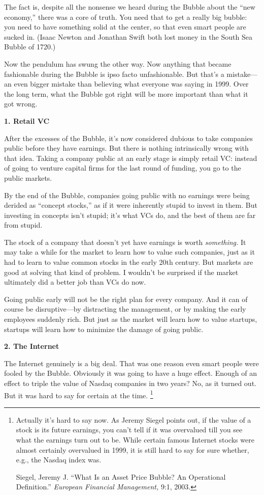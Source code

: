 The fact is, despite all the nonsense we heard during the Bubble about
the ``new economy,'' there was a core of truth. You need that to get a
really big bubble: you need to have something solid at the center, so
that even smart people are sucked in. (Isaac Newton and Jonathan Swift
both lost money in the South Sea Bubble of 1720.)

Now the pendulum has swung the other way. Now anything that became
fashionable during the Bubble is ipso facto unfashionable. But that's a
mistake---an even bigger mistake than believing what everyone was saying
in 1999. Over the long term, what the Bubble got right will be more
important than what it got wrong.

\textbf{1. Retail VC}

After the excesses of the Bubble, it's now considered dubious to take
companies public before they have earnings. But there is nothing
intrinsically wrong with that idea. Taking a company public at an early
stage is simply retail VC: instead of going to venture capital firms for
the last round of funding, you go to the public markets.

By the end of the Bubble, companies going public with no earnings were
being derided as ``concept stocks,'' as if it were inherently stupid to
invest in them. But investing in concepts isn't stupid; it's what VCs
do, and the best of them are far from stupid.

The stock of a company that doesn't yet have earnings is worth
\emph{something.} It may take a while for the market to learn how to
value such companies, just as it had to learn to value common stocks in
the early 20th century. But markets are good at solving that kind of
problem. I wouldn't be surprised if the market ultimately did a better
job than VCs do now.

Going public early will not be the right plan for every company. And it
can of course be disruptive---by distracting the management, or by
making the early employees suddenly rich. But just as the market will
learn how to value startups, startups will learn how to minimize the
damage of going public.

\textbf{2. The Internet}

The Internet genuinely is a big deal. That was one reason even smart
people were fooled by the Bubble. Obviously it was going to have a huge
effect. Enough of an effect to triple the value of Nasdaq companies in
two years? No, as it turned out. But it was hard to say for certain at
the time. \footnote{Actually it's hard to say now. As Jeremy Siegel points out, if
the value of a stock is its future earnings, you can't tell if it was
overvalued till you see what the earnings turn out to be. While certain
famous Internet stocks were almost certainly overvalued in 1999, it is
still hard to say for sure whether, e.g., the Nasdaq index was.

Siegel, Jeremy J. ``What Is an Asset Price Bubble? An Operational
Definition.'' \emph{European Financial Management,} 9:1, 2003.}

